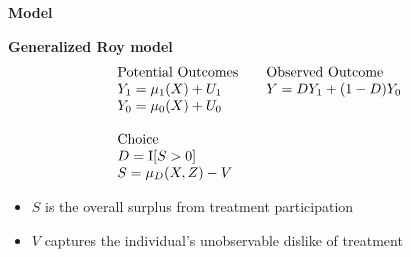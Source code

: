 \begin{frame}\begin{center}
	\LARGE\textbf{Model}
\end{center}\end{frame}
\begin{frame}
	\textbf{Generalized Roy model}
	\begin{align*}\begin{array}{l@{\qquad}l}
			\text{Potential Outcomes} &\text{Observed Outcome}\\
			Y_1 = \mu_1(X) + U_1      &  Y = D Y_1 + (1 - D)Y_0 \\
			Y_0 = \mu_0(X) + U_0      &\\
			& \\
			\text{Choice} & \\
			D = \mathrm{I}[S > 0] & \\
			S = \mu_D(X, Z) - V
		\end{array}
	\end{align*}

\end{frame}
\begin{frame}
\begin{itemize}\setlength\itemsep{1em}
	\item $S$ is the overall surplus from treatment participation
	\item $V$ captures the individual's unobservable dislike of treatment
\end{itemize}
\end{frame}


